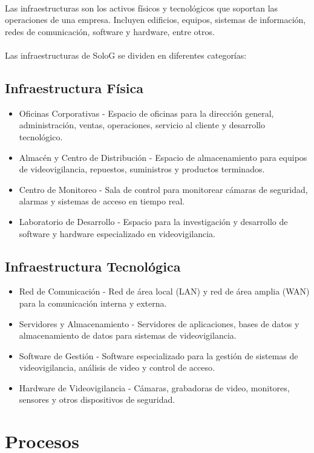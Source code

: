 \documentclass{report}
\begin{document}
          \paragraph*{}
          {
            Las infraestructuras son los activos físicos y tecnológicos que soportan las operaciones de una empresa. 
            Incluyen edificios, equipos, sistemas de información, redes de comunicación, software y hardware, entre otros.
          }
          \paragraph*{}
          {
            Las infraestructuras de SoloG se dividen en diferentes categorías:
          }
          \subsection{Infraestructura Física}
            \begin{itemize}
              \item Oficinas Corporativas - Espacio de oficinas para la dirección general, administración, ventas, operaciones, servicio al cliente y desarrollo tecnológico.
              \item Almacén y Centro de Distribución - Espacio de almacenamiento para equipos de videovigilancia, repuestos, suministros y productos terminados.
              \item Centro de Monitoreo - Sala de control para monitorear cámaras de seguridad, alarmas y sistemas de acceso en tiempo real.
              \item Laboratorio de Desarrollo - Espacio para la investigación y desarrollo de software y hardware especializado en videovigilancia.
            \end{itemize}
          \subsection{Infraestructura Tecnológica}
            \begin{itemize}
              \item Red de Comunicación - Red de área local (LAN) y red de área amplia (WAN) para la comunicación interna y externa.
              \item Servidores y Almacenamiento - Servidores de aplicaciones, bases de datos y almacenamiento de datos para sistemas de videovigilancia.
              \item Software de Gestión - Software especializado para la gestión de sistemas de videovigilancia, análisis de video y control de acceso.
              \item Hardware de Videovigilancia - Cámaras, grabadoras de video, monitores, sensores y otros dispositivos de seguridad.
            \end{itemize}
        \clearpage\section{Procesos}
\end{document}
